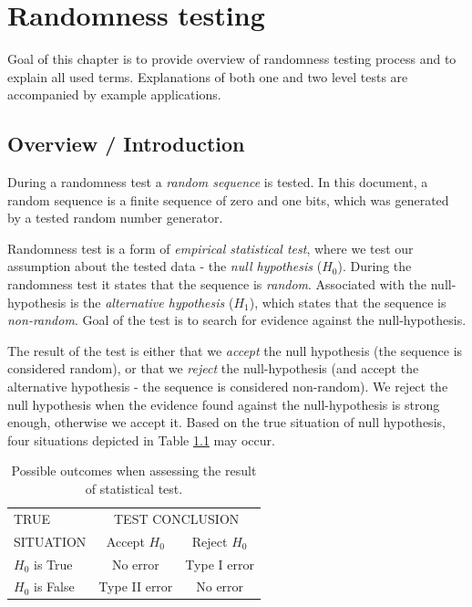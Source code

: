 \documentclass[
  digital,     %
  oneside,     %
  nosansbold,  %
  nocolorbold, %
  nolof,         %
  nolot,         %
]{fithesis4}
\begin{document}
\chapter{Randomness testing} \label{chap:rand}

Goal of this chapter is to provide overview of randomness testing process and to explain all used terms. Explanations of both one and two level tests are accompanied by example applications.

\section{Overview / Introduction} \label{chap:rand-intro}


During a randomness test a \emph{random sequence} is tested. In this document, a random sequence is a finite sequence of zero and one bits, which was generated by a tested random number generator.  \cite[p. 1-1]{nist_special} 


Randomness test is a form of \emph{empirical statistical test}, where we test our assumption about the tested data - the \emph{null hypothesis} ($H_0$). During the randomness test it states that the sequence is \emph{random}. Associated with the null-hypothesis is the \emph{alternative hypothesis} ($H_1$), which states that the sequence is \emph{non-random}. Goal of the test is to search for evidence against the null-hypothesis. \cite[p. 2]{tu01_guide}



The result of the test is either that we \emph{accept} the null hypothesis (the sequence is considered random), or that we \emph{reject} the null-hypothesis (and accept the alternative hypothesis - the sequence is considered non-random). We reject the null hypothesis when the evidence found against the null-hypothesis is strong enough, otherwise we accept it. Based on the true situation of null hypothesis, four situations depicted in Table \ref{tab:type_errors} may occur. \cite[p. 417]{basic_practice}

\begin{table}
  \begin{tabularx}{0.7\textwidth}{l|c|c}
    TRUE  & \multicolumn{2}{c}{TEST CONCLUSION}\\
    SITUATION &Accept $H_0$ & Reject $H_0$\\
    \midrule
    $H_0$ is True &  No error & Type I error  \\
    $H_0$ is False & Type II error & No error \\
  \end{tabularx}
  \caption{Possible outcomes when assessing the result of statistical test.}
  \label{tab:type_errors}
\end{table}
\end{document}
